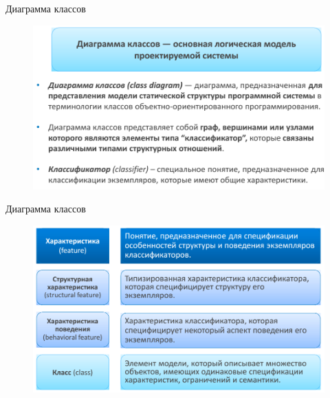 \documentclass{beamer}
\begin{document}
\begin{frame}[t]{Диаграмма классов}
\begin{figure}[h]
\centering
\includegraphics[scale=0.45]{images/lec03-pic16.png}
\end{figure}
\end{frame}

\begin{frame}[t]{Диаграмма классов}
\begin{figure}[h]
\centering
\includegraphics[scale=0.45]{images/lec03-pic17.png}
\end{figure}
\end{frame}
\end{document}

